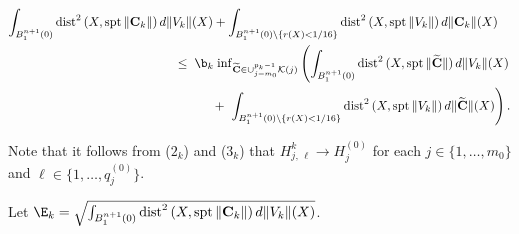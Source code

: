 \documentclass[a4paper,11pt]{amsart}
\begin{document}
\begin{itemize}
\begin{itemize}
\begin{eqnarray*}
\int_{B_{1}^{n+1}(0)} {\rm dist}^{2} \, (X, {\rm spt} \,\|{\mathbf C}_{k}\|) \, d\|V_{k}\|(X) +  \int_{B_{1}^{n+1}(0) \setminus \{r(X) < 1/16\}} {\rm dist}^{2} \, (X, {\rm spt} \,\|V_{k}\|) \, d\|{\mathbf C}_{k}\|(X)&&\\
&&\hspace{-5in} \leq \; \b_{k}\; {\rm inf}_{\widetilde{\mathbf C} \in \cup_{j=m_{0}}^{p_{k}-1} {\mathcal K}(j)} 
\left(\int_{B_{1}^{n+1}(0)} {\rm dist}^{2} \, (X, {\rm spt} \,\|\widetilde{\mathbf C}\|) \, d\|V_{k}\|(X)\right.\\
&&\hspace{-3.5in}+\;  \left.\int_{B_{1}^{n+1}(0) \setminus \{r(X) < 1/16\}} {\rm dist}^{2} \, (X, {\rm spt} \,\|V_{k}\|) \, d\|\widetilde{\mathbf C}\|(X)   \right). 
\end{eqnarray*} 
\end{itemize} 
\end{itemize}
Note that it follows from ($2_{k}$) and ($3_{k}$) that 
$H^{k}_{j, \, \ell} \to H_{j}^{(0)}$ for each $j \in \{1, \ldots, m_{0}\}$ and $\ell \in \{1, \ldots,q_{j}^{(0)}\}$.

Let ${\E}_{k} = \sqrt{\int_{B_{1}^{n+1}(0)} {\rm dist}^{2} \, (X, {\rm spt} \,\|{\mathbf C}_{k}\|) \, d\|V_{k}\|(X)}$.
\end{document}
